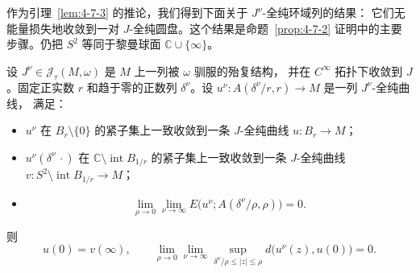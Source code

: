 作为引理~\ref{lem:4-7-3} 的推论，我们得到下面关于 $J^\nu$-全纯环域列的结果：
它们无能量损失地收敛到一对 $J$-全纯圆盘。这个结果是命题~\ref{prop:4-7-2}
证明中的主要步骤。仍把 $S^2$ 等同于黎曼球面 $\mathbb C\cup\{\infty\}$。

\begin{lemma}\label{lem:4-7-5}
设 $J^\nu\in\mathcal J_\tau(M,\omega)$ 是 $M$ 上一列被 $\omega$ 驯服的殆复结构，
并在 $C^\infty$ 拓扑下收敛到 $J$。固定正实数 $r$ 和趋于零的正数列
$\delta^\nu$。设 $u^\nu:A(\delta^\nu/r,r)\to M$ 是一列 $J^\nu$-全纯曲线，
满足：
\begin{itemize}
\item $u^\nu$ 在 $B_r\setminus\{0\}$ 的紧子集上一致收敛到一条
$J$-全纯曲线 $u:B_r\to M$；
\item $u^\nu(\delta^\nu\,\cdot)$ 在
$\mathbb C\setminus\operatorname{int}B_{1/r}$ 的紧子集上一致收敛到一条
$J$-全纯曲线
$v:S^2\setminus\operatorname{int}B_{1/r}\to M$；
\item
\[
  \lim_{\rho\to0}\lim_{\nu\to\infty}
  E\bigl(u^\nu;A(\delta^\nu/\rho,\rho)\bigr)=0.
\]
\end{itemize}
则
\[
  u(0)=v(\infty),
  \qquad
  \lim_{\rho\to0}\lim_{\nu\to\infty}
  \sup_{\delta^\nu/\rho\le|z|\le\rho}
  d\bigl(u^\nu(z),u(0)\bigr)=0.
\]
\end{lemma}

